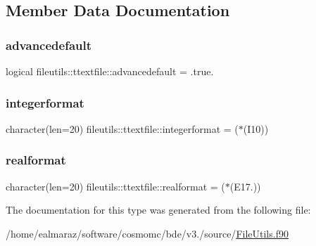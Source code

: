 \subsection{Member Data Documentation}
\mbox{\label{structfileutils_1_1ttextfile_a0031d2133dcfbb314e9ca373786619c1}} 
\subsubsection{\texorpdfstring{advancedefault}{advancedefault}}
{\footnotesize\ttfamily logical fileutils\+::ttextfile\+::advancedefault = .true.\hspace{0.3cm}{\ttfamily [private]}}

\mbox{\label{structfileutils_1_1ttextfile_ae13395763c0f8c678fbaa6905f391450}} 
\subsubsection{\texorpdfstring{integerformat}{integerformat}}
{\footnotesize\ttfamily character(len=20) fileutils\+::ttextfile\+::integerformat = \textquotesingle{}($\ast$(I10))\textquotesingle{}\hspace{0.3cm}{\ttfamily [private]}}

\mbox{\label{structfileutils_1_1ttextfile_acdb4cf6536a6fbf2b26e39e5ed92de5d}} 
\subsubsection{\texorpdfstring{realformat}{realformat}}
{\footnotesize\ttfamily character(len=20) fileutils\+::ttextfile\+::realformat = \textquotesingle{}($\ast$(E17.))\textquotesingle{}\hspace{0.3cm}{\ttfamily [private]}}



The documentation for this type was generated from the following file\+:\begin{DoxyCompactItemize}
\item 
/home/ealmaraz/software/cosmomc/bde/v3./source/\mbox{\hyperlink{FileUtils_8f90}{File\+Utils.\+f90}}\end{DoxyCompactItemize}
